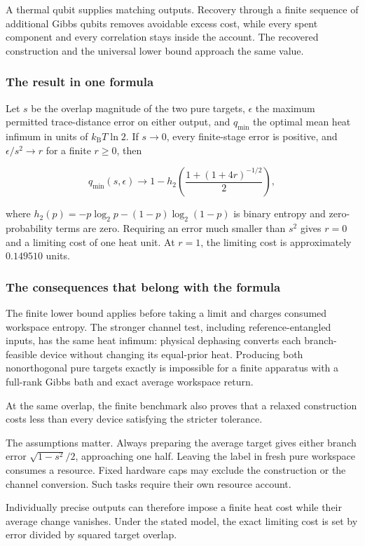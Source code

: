 \documentclass[11pt,letterpaper]{article}
\begin{document}
A thermal qubit supplies matching outputs. Recovery through a finite sequence of additional Gibbs qubits removes avoidable excess cost, while every spent component and every correlation stays inside the account. The recovered construction and the universal lower bound approach the same value.

\subsubsection{The result in one formula}\label{the-result-in-one-formula}

Let \(s\) be the overlap magnitude of the two pure targets, \(\epsilon\) the maximum permitted trace-distance error on either output, and \(q_{\min}\) the optimal mean heat infimum in units of \(k_{\mathrm{B}}T\ln 2\). If \(s \rightarrow 0\), every finite-stage error is positive, and \(\epsilon/s^{2} \rightarrow r\) for a finite \(r \geq 0\), then

\[q_{\min}(s,\epsilon) \rightarrow 1 - h_{2}\left( \frac{1 + (1 + 4r)^{- 1/2}}{2} \right),\]

where \(h_{2}(p) = - p\log_{2}p - (1 - p)\log_{2}(1 - p)\) is binary entropy and zero-probability terms are zero. Requiring an error much smaller than \(s^{2}\) gives \(r = 0\) and a limiting cost of one heat unit. At \(r = 1\), the limiting cost is approximately \(0.149510\) units.

\subsubsection{The consequences that belong with the formula}\label{the-consequences-that-belong-with-the-formula}

The finite lower bound applies before taking a limit and charges consumed workspace entropy. The stronger channel test, including reference-entangled inputs, has the same heat infimum: physical dephasing converts each branch-feasible device without changing its equal-prior heat. Producing both nonorthogonal pure targets exactly is impossible for a finite apparatus with a full-rank Gibbs bath and exact average workspace return.

At the same overlap, the finite benchmark also proves that a relaxed construction costs less than every device satisfying the stricter tolerance.

The assumptions matter. Always preparing the average target gives either branch error \(\sqrt{1 - s^{2}}/2\), approaching one half. Leaving the label in fresh pure workspace consumes a resource. Fixed hardware caps may exclude the construction or the channel conversion. Such tasks require their own resource account.

Individually precise outputs can therefore impose a finite heat cost while their average change vanishes. Under the stated model, the exact limiting cost is set by error divided by squared target overlap.
\end{document}
